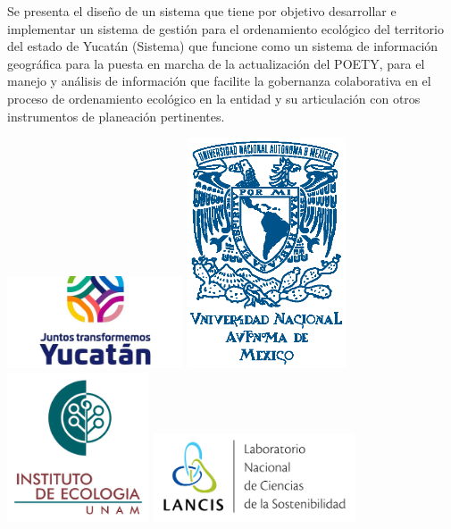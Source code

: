 \begin{titlepage}
\begin{minipage}[t]{0.6\textwidth}
Se presenta el diseño de un sistema que tiene por objetivo desarrollar e implementar un sistema de gestión para el ordenamiento ecológico del territorio del estado de Yucatán (Sistema) que funcione como un sistema de información geográfica para la puesta en marcha de la actualización del POETY, para el manejo y análisis  de información que facilite la gobernanza colaborativa en el proceso de ordenamiento ecológico en la entidad y su articulación con otros instrumentos de planeación pertinentes.
\end{minipage}%
\hfill
\begin{minipage}[t]{0.25\textwidth} 
  \includegraphics[width=52mm]{images/yucatan_logo}\vspace{2cm}
  \includegraphics[width=47mm]{images/UNAM}\vspace{2cm}
  \includegraphics[width=42mm]{images/ie_logo}\vspace{2cm}
  \includegraphics[width=60mm]{images/lancis_logo}
\end{minipage}

\end{titlepage}

\pagebreak

\restoregeometry